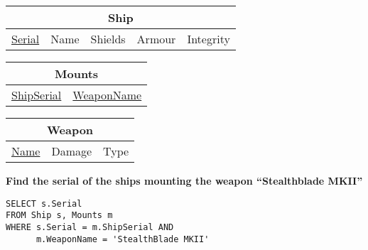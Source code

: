 \documentclass{beamer}
\begin{document}
\begin{frame}[fragile]

\begin{tabular}{|c|c|c|c|c|}
\hline
\multicolumn{5}{|c|}{\textbf{Ship}} \\
\hline
\underline{Serial} & Name & Shields & Armour & Integrity \\
\hline
\end{tabular}

\begin{tabular}{|c|c|}
\hline
\multicolumn{2}{|c|}{\textbf{Mounts}} \\
\hline
\underline{ShipSerial} & \underline{WeaponName} \\
\hline
\end{tabular}

\begin{tabular}{|c|c|c|}
\hline
\multicolumn{3}{|c|}{\textbf{Weapon}} \\
\hline
\underline{Name} & Damage & Type \\
\hline
\end{tabular}

\vspace{0.25cm}
\textbf{Find the serial of the ships mounting the weapon ``Stealthblade MKII''}
\pause
\begin{lstlisting}[showstringspaces=false]
SELECT s.Serial
FROM Ship s, Mounts m
WHERE s.Serial = m.ShipSerial AND 
      m.WeaponName = 'StealthBlade MKII'
\end{lstlisting}

\end{frame}
\end{document}
